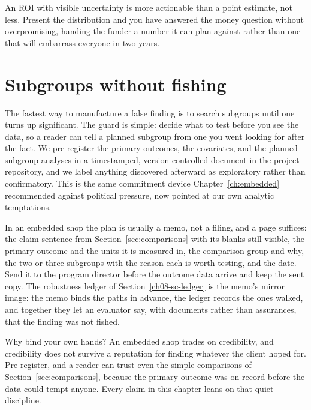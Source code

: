 \documentclass[
    a4paper,
    fontsize=10pt,
    twoside=true,
    numbers=noenddot,
]{kaobook}
\begin{document}
An ROI with visible uncertainty is more actionable than a point estimate, not less. Present the distribution and you have answered the money question without overpromising, handing the funder a number it can plan against rather than one that will embarrass everyone in two years.

\section{Subgroups without fishing}\label{sec:prereg}
The fastest way to manufacture a false finding is to search subgroups until one turns up significant. The guard is simple: decide what to test before you see the data, so a reader can tell a planned subgroup from one you went looking for after the fact. We pre-register the primary outcomes, the covariates, and the planned subgroup analyses in a timestamped, version-controlled document in the project repository, and we label anything discovered afterward as exploratory rather than confirmatory. This is the same commitment device Chapter~\ref{ch:embedded} recommended against political pressure, now pointed at our own analytic temptations.

In an embedded shop the plan is usually a memo, not a filing, and a page suffices: the claim sentence from Section~\ref{sec:comparisons} with its blanks still visible, the primary outcome and the units it is measured in, the comparison group and why, the two or three subgroups with the reason each is worth testing, and the date. Send it to the program director before the outcome data arrive and keep the sent copy. The robustness ledger of Section~\ref{ch08-sc-ledger} is the memo's mirror image: the memo binds the paths in advance, the ledger records the ones walked, and together they let an evaluator say, with documents rather than assurances, that the finding was not fished.

Why bind your own hands? An embedded shop trades on credibility, and credibility does not survive a reputation for finding whatever the client hoped for. Pre-register, and a reader can trust even the simple comparisons of Section~\ref{sec:comparisons}, because the primary outcome was on record before the data could tempt anyone. Every claim in this chapter leans on that quiet discipline.
\end{document}
